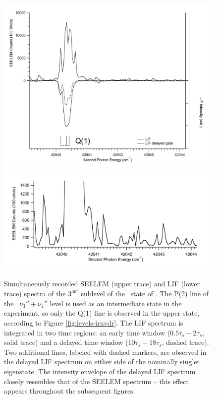 \begin{figure}
  \caption{Simultaneously recorded SEELEM (upper trace) and LIF (lower
    trace) spectra of the $3^36^1$  sublevel of the \astate\
    state of .  The P(2) line of the \xstate\ $\nu_3'' +
    \nu_4''$ level is used as an intermediate state in the experiment,
    so only the Q(1) line is observed in the upper state, according to
    Figure \ref{fig:levels-iruvdr}.  The LIF spectrum is integrated in
    two time regions: an early time window ($0.5\tau_s-2\tau_s$, solid
    trace) and a delayed time window ($10\tau_s-18\tau_s$, dashed
    trace).  Two additional lines, labeled with dashed markers, are
    observed in the delayed LIF spectrum on either side of the
    nominally singlet eigenstate. The intensity envelope of the
    delayed LIF spectrum closely resembles that of the SEELEM spectrum
    -- this effect appears throughout the subsequent figures.}
  \label{fig:3361-q1}
  \centering
  \includegraphics[width=6in]{spectrum-3361-q1-split.pdf}
  \includegraphics[width=5.5in]{spectrum-3361-q1-zoom.pdf}
\end{figure}

